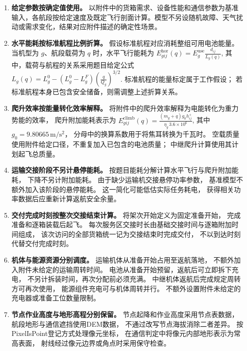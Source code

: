 \documentclass[bwprint]{gmcmthesis}
\begin{document}
\begin{enumerate}

\item \textbf{给定参数按确定值使用。} 以附件中的货箱需求、设备性能和通信参数为基准输入，各航段按给定速度及既定飞行剖面计算。模型不另设随机故障、天气扰动或需求变化，结果对应附件描述的确定性场景。

    \item \textbf{水平能耗按标准航程比例折算。}
    假设标准航程对应消耗整组可用电池能量。
    当机型为 $g$、航段载荷为 $q$ 时，水平飞行能耗为
\(E^{\mathrm{hor}}_{gij}(q) = E_g^{\mathrm{use}} \frac{d_{ij}}{L_g(q)}\),
    其中，载荷与航程的关系采用题目给定公式
\(L_g(q) = L_g^{0} - \left(L_g^{0}-L_g^{F}\right) \left(\frac{q}{Q_g}\right)^{3/2}\).
    标准航程的能量标定属于工作假设；
    若标准航程本身已包含安全储备，则需调整上述折算关系。

    \item \textbf{爬升效率按能量转化效率解释。}
    将附件中的爬升效率解释为电能转化为重力势能的效率，
    爬升附加能耗表示为
\(E^{\mathrm{climb}}_{gij}(q) = \frac{(m_g+q)g_0h_{ij}^{+}} {\eta_g\,3.6\times10^{6}}\),
    其中 $g_0=9.80665\,\mathrm{m/s^2}$，
    分母中的换算系数用于将焦耳转换为千瓦时。
    空载质量使用附件给定口径，不重复加入已包含的电池质量；
    中继爬升计算使用其计划起飞总质量。

    \item \textbf{运输交接阶段不另计悬停能耗。}
    按题目能耗分解计算水平飞行与爬升附加能耗，
    下降不另计附加能耗。
    由于缺少运输机交接悬停功率参数，
    基准模型不额外加入该阶段的悬停能耗。
    这一简化可能低估实际任务耗电，
    获得相关功率数据后应重新计算返航安全余量。

    \item \textbf{交付完成时刻按整次交接结束计算。}
    将架次开始定义为固定准备开始，
    完成准备和逐箱装载后起飞。
    每次服务区交接时长由基础交接时间与逐箱附加时间组成，
    该次访问的全部货箱统一记为交接结束时完成交付，
    不以到达时刻代替交付完成时刻。

    \item \textbf{机体与能源资源分别调度。}
    运输机体从准备开始占用至返航落地，
    不额外加入附件未给定的运输周转时间。
    电池从准备开始预留，返航后可立即拆下充电，
    不另计拆装时间，再次分配前必须充满。
    中继机体返航后完成规定周转方可再次使用，
    能源组件充电可与机体周转并行。
    不额外设置附件未给定的充电器或准备工位数量限制。

    \item \textbf{节点作业高度与地形高程分别保留。}
    节点起降和作业高度采用节点表数据，
    航段地形与通信遮挡使用DEM数据，
    不通过改写节点海拔消除二者差异。
    按PixelIsPoint登记方式处理像元坐标，
    在通信判定中将像元内部地形表示为常高表面，
    射线经过像元边界或角点时采用保守检查。


\end{enumerate}
\end{document}

